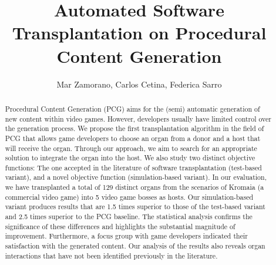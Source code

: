\documentclass[sigconf,screen,review,anonymous]{acmart}
\title{Automated Software Transplantation on Procedural Content Generation}
\author{Mar Zamorano, Carlos Cetina, Federica Sarro}
\newcommand{\CaseStudy}{Kromaia}
\begin{document}
\begin{abstract}
Procedural Content Generation (PCG) aims for the (semi) automatic generation of new content within video games. However, developers usually have limited control over the generation process.
We propose the first transplantation algorithm in the field of PCG that allows game developers to choose an organ from a donor and a host that will receive the organ. Through our approach, we aim to search for an appropriate solution to integrate the organ into the host. We also study two distinct objective functions: The one accepted in the literature of  software transplantation (test-based variant), and a novel objective function (simulation-based variant).
In our evaluation, we have transplanted a total of 129 distinct organs from the scenarios of \CaseStudy{} (a commercial video game) into 5 video game bosses as hosts.
Our simulation-based variant produces results that are 1.5 times superior to those of the test-based variant and 2.5 times superior to the PCG baseline. The statistical analysis confirms the significance of these differences and highlights the substantial magnitude of improvement.
Furthermore, a focus group with game developers indicated their satisfaction with the generated content.
Our analysis of the results also reveals organ interactions that have not been  identified previously in the literature.
\end{abstract}




\maketitle












%

\end{document}
